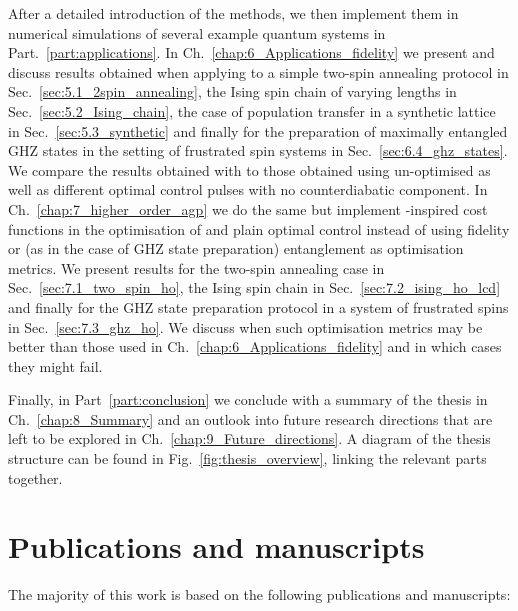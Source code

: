 After a detailed introduction of the methods, we then implement them in numerical simulations of several example quantum systems in Part.~\ref{part:applications}. In Ch.~\ref{chap:6_Applications_fidelity} we present and discuss results obtained when applying  to a simple two-spin annealing protocol in Sec.~\ref{sec:5.1_2spin_annealing}, the Ising spin chain of varying lengths in Sec.~\ref{sec:5.2_Ising_chain}, the case of population transfer in a synthetic lattice in Sec.~\ref{sec:5.3_synthetic} and finally for the preparation of maximally entangled GHZ states in the setting of frustrated spin systems in Sec.~\ref{sec:6.4_ghz_states}. We compare the results obtained with  to those obtained using un-optimised  as well as different optimal control pulses with no counterdiabatic component. In Ch.~\ref{chap:7_higher_order_agp} we do the same but implement -inspired cost functions in the optimisation of  and plain optimal control instead of using fidelity or (as in the case of GHZ state preparation) entanglement as optimisation metrics. We present results for the two-spin annealing case in Sec.~\ref{sec:7.1_two_spin_ho}, the Ising spin chain in Sec.~\ref{sec:7.2_ising_ho_lcd} and finally for the GHZ state preparation protocol in a system of frustrated spins in Sec.~\ref{sec:7.3_ghz_ho}. We discuss when such optimisation metrics may be better than those used in Ch.~\ref{chap:6_Applications_fidelity} and in which cases they might fail.

Finally, in Part~\ref{part:conclusion} we conclude with a summary of the thesis in Ch.~\ref{chap:8_Summary} and an outlook into future research directions that are left to be explored in Ch.~\ref{chap:9_Future_directions}. A diagram of the thesis structure can be found in Fig.~\ref{fig:thesis_overview}, linking the relevant parts together.

\section{Publications and manuscripts}

The majority of this work is based on the following publications and manuscripts:


